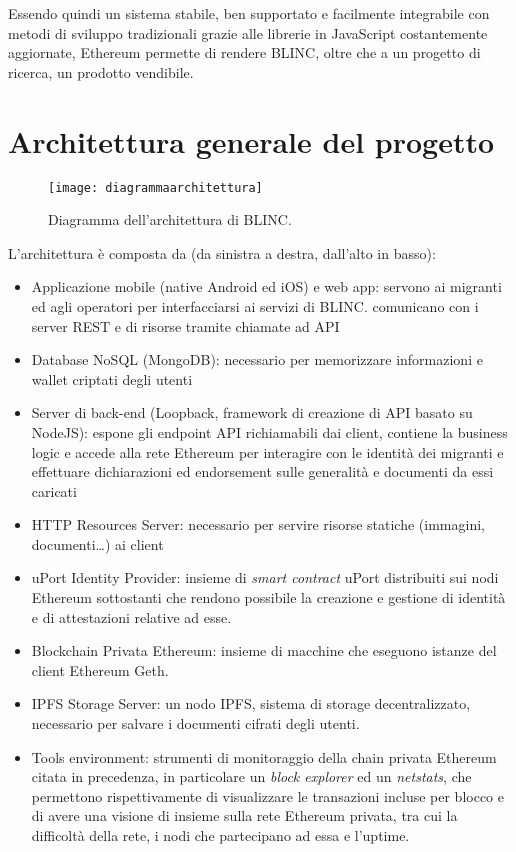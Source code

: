 Essendo quindi un sistema stabile, ben supportato e facilmente integrabile con metodi di sviluppo tradizionali
grazie alle librerie in JavaScript costantemente aggiornate, Ethereum permette di rendere BLINC,
oltre che a un progetto di ricerca, un prodotto vendibile.

\section{Architettura generale del progetto}

\begin{figure}[!ht]
    \texttt{[image: diagrammaarchitettura]}
    \caption{Diagramma dell'architettura di BLINC.}
    \label{fig:diagrammaarchitettura}
\end{figure}

L’architettura è composta da (da sinistra a destra, dall’alto in basso):
\begin{itemize}
    \item Applicazione mobile (native Android ed iOS) e web app: servono ai migranti ed agli operatori
    per interfacciarsi ai servizi di BLINC.
    comunicano con i server REST e di risorse tramite chiamate ad API
    \item Database NoSQL (MongoDB): necessario per memorizzare informazioni e wallet criptati degli utenti
    \item Server di back-end (Loopback, framework di creazione di API basato su NodeJS): espone gli endpoint API richiamabili
    dai client, contiene la business logic e accede alla rete Ethereum per interagire
    con le identità dei migranti e effettuare dichiarazioni ed endorsement sulle generalità e documenti da essi caricati
    \item HTTP Resources Server: necessario per servire risorse statiche (immagini, documenti…) ai client
    \item uPort Identity Provider: insieme di \emph{smart contract} uPort distribuiti sui nodi Ethereum sottostanti che rendono
    possibile la creazione e gestione di identità e di attestazioni relative ad esse.
    \item Blockchain Privata Ethereum: insieme di macchine che eseguono istanze del client Ethereum Geth.
    \item IPFS Storage Server: un nodo IPFS, sistema di storage decentralizzato, necessario per salvare i 
    documenti cifrati degli utenti.
    \item Tools environment: strumenti di monitoraggio della chain privata Ethereum citata in precedenza,
    in particolare un \emph{block explorer} ed un
    \emph{netstats}, che permettono rispettivamente di visualizzare le transazioni incluse per blocco
    e di avere una visione di insieme sulla rete Ethereum privata,
    tra cui la difficoltà della rete, i nodi che partecipano ad essa e l'uptime.
\end{itemize}

